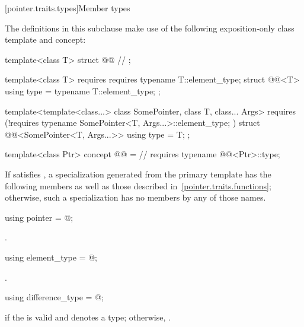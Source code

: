 [pointer.traits.types]{Member types}

\pnum
The definitions in this subclause make use of
the following exposition-only class template and concept:
\begin{codeblock}
template<class T>
struct @@          // \expos
{ };

template<class T> requires requires { typename T::element_type; }
struct @@<T>
{ using type = typename T::element_type; };

template<template<class...> class SomePointer, class T, class... Args>
  requires (!requires { typename SomePointer<T, Args...>::element_type; })
struct @@<SomePointer<T, Args...>>
{ using type = T; };

template<class Ptr>
  concept @@ =       // \expos
    requires { typename @@<Ptr>::type; }
\end{codeblock}

\pnum
If  satisfies ,
a specialization 
generated from the  primary template
has the following members
as well as those described in~\ref{pointer.traits.functions};
otherwise, such a specialization has no members by any of those names.

%
\begin{itemdecl}
using pointer = @\seebelow@;
\end{itemdecl}

\begin{itemdescr}
\pnum
\ctype {}.
\end{itemdescr}

%
\begin{itemdecl}
using element_type = @\seebelow@;
\end{itemdecl}

\begin{itemdescr}
\pnum
\ctype {}.
\end{itemdescr}

%
\begin{itemdecl}
using difference_type = @\seebelow@;
\end{itemdecl}

\begin{itemdescr}
\pnum
\ctype {} if
the   is valid and denotes a
type; otherwise,
.
\end{itemdescr}

